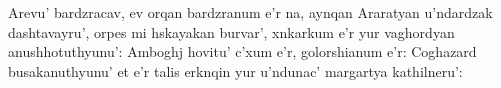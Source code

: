 Arevu' bardzracav, ev orqan bardzranum e'r na, aynqan Araratyan u'ndardzak
dash\-ta\-vayru', orpes mi hskayakan burvar', xnkarkum e'r yur vaghordyan
anushhotuthyunu': Amboghj hovitu' c'xum e'r, golorshianum e'r: Coghazard
busakanuthyunu' et e'r talis erknqin yur u'ndunac' margartya kathilneru':

\bye
